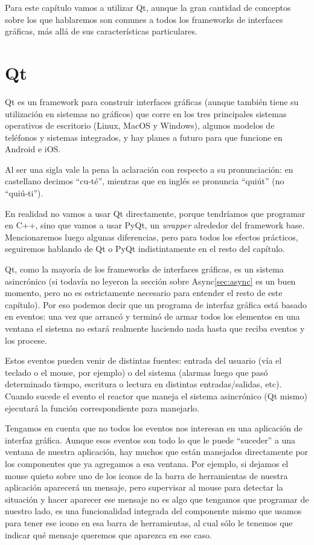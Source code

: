 Para este capítulo vamos a utilizar Qt, aunque la gran cantidad de conceptos sobre los que hablaremos son comunes a todos los frameworks de interfaces gráficas, más allá de sus características particulares.


\section{Qt}

Qt es un framework para construir interfaces gráficas (aunque también tiene su utilización en sistemas no gráficos) que corre en los tres principales sistemas operativos de escritorio (Linux, MacOS y Windows), algunos modelos de teléfonos y sistemas integrados, y hay planes a futuro para que funcione en Android e iOS.

Al ser una sigla vale la pena la aclaración con respecto a su pronunciación: en castellano decimos ``cu-té'', mientras que en inglés se pronuncia ``quiút'' (no ``quiú-ti'').

En realidad no vamos a usar Qt directamente, porque tendríamos que programar en C++, sino que vamos a usar PyQt, un \textit{wrapper} alrededor del framework base. Mencionaremos luego algunas diferencias, pero para todos los efectos prácticos, seguiremos hablando de Qt o PyQt indistintamente en el resto del capítulo.

Qt, como la mayoría de los frameworks de interfaces gráficas, es un sistema asincrónico (si todavía no leyeron la sección sobre Async\ref{sec:async} es un buen momento, pero no es estrictamente necesario para entender el resto de este capítulo). Por eso podemos decir que un programa de interfaz gráfica está basado en eventos: una vez que arrancó y terminó de armar todos los elementos en una ventana el sistema no estará realmente haciendo nada hasta que reciba eventos y los procese. 

Estos eventos pueden venir de distintas fuentes: entrada del usuario (vía el teclado o el mouse, por ejemplo) o del sistema (alarmas luego que pasó determinado tiempo, escritura o lectura en distintas entradas/salidas, etc). Cuando sucede el evento el reactor que maneja el sistema asincrónico (Qt mismo) ejecutará la función correspondiente para manejarlo.

Tengamos en cuenta que no todos los eventos nos interesan en una aplicación de interfaz gráfica. Aunque esos eventos son todo lo que le puede ``suceder'' a una ventana de nuestra aplicación, hay muchos que están manejados directamente por los componentes que ya agregamos a esa ventana. Por ejemplo, si dejamos el mouse quieto sobre uno de los iconos de la barra de herramientas de nuestra aplicación aparecerá un mensaje, pero supervisar al mouse para detectar la situación y hacer aparecer ese mensaje no es algo que tengamos que programar de nuestro lado, es una funcionalidad integrada del componente mismo que usamos para tener ese icono en esa barra de herramientas, al cual sólo le tenemos que indicar qué mensaje queremos que aparezca en ese caso.

